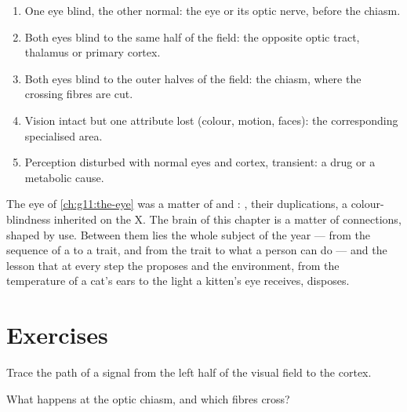 \begin{method}\label{met:g11:vision-and-brain:locate}
\begin{enumerate}
  \item One eye blind, the other normal: the eye or its optic nerve,
        before the chiasm.
  \item Both eyes blind to the same half of the field: the opposite
        optic tract, thalamus or primary cortex.
  \item Both eyes blind to the outer halves of the field: the chiasm,
        where the crossing fibres are cut.
  \item Vision intact but one attribute lost (colour, motion, faces):
        the corresponding specialised area.
  \item Perception disturbed with normal eyes and cortex, transient: a
        drug or a metabolic cause.
\end{enumerate}
\end{method}

\begin{remark}\label{rem:g11:vision-and-brain:year}
The eye of \cref{ch:g11:the-eye} was a matter of  and :
, their duplications, a colour-blindness inherited on the X.
The brain of this chapter is a matter of connections, shaped by use.
Between them lies the whole subject of the year --- from the sequence
of a  to a trait, and from the trait to what a person can do ---
and the lesson that at every step the  proposes and the
environment, from the temperature of a cat's ears to the light a
kitten's eye receives, disposes.
\end{remark}

\section{Exercises}

\begin{exercise}[$\star$]\label{exo:g11:vision-and-brain:1}
Trace the path of a signal from the left half of the visual field to
the cortex.
\end{exercise}

\begin{exercise}[$\star$]\label{exo:g11:vision-and-brain:2}
What happens at the optic chiasm, and which fibres cross?
\end{exercise}

